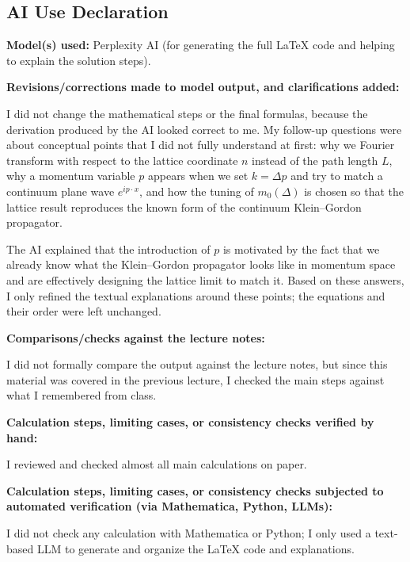 \documentclass[11pt,a4paper,oneside]{article}
\begin{document}
\newpage
\subsection*{AI Use Declaration}

\textbf{Model(s) used:}
Perplexity AI (for generating the full LaTeX code and helping to explain the solution steps).

\textbf{Revisions/corrections made to model output, and clarifications added:}

I did not change the mathematical steps or the final formulas, because the derivation produced by the AI looked correct to me. My follow-up questions were about conceptual points that I did not fully understand at first: why we Fourier transform with respect to the lattice coordinate $n$ instead of the path length $L$, why a momentum variable $p$ appears when we set $k = \Delta p$ and try to match a continuum plane wave $e^{ip\cdot x}$, and how the tuning of $m_0(\Delta)$ is chosen so that the lattice result reproduces the known form of the continuum Klein--Gordon propagator.

The AI explained that the introduction of $p$ is motivated by the fact that we already know what the Klein--Gordon propagator looks like in momentum space and are effectively designing the lattice limit to match it. Based on these answers, I only refined the textual explanations around these points; the equations and their order were left unchanged.

\textbf{Comparisons/checks against the lecture notes:}

I did not formally compare the output against the lecture notes, but since this material was covered in the previous lecture, I checked the main steps against what I remembered from class.

\textbf{Calculation steps, limiting cases, or consistency checks verified by hand:}

I reviewed and checked almost all main calculations on paper.

\textbf{Calculation steps, limiting cases, or consistency checks subjected to automated verification (via Mathematica, Python, LLMs):}

I did not check any calculation with Mathematica or Python; I only used a text-based LLM to generate and organize the LaTeX code and explanations.
\end{document}
